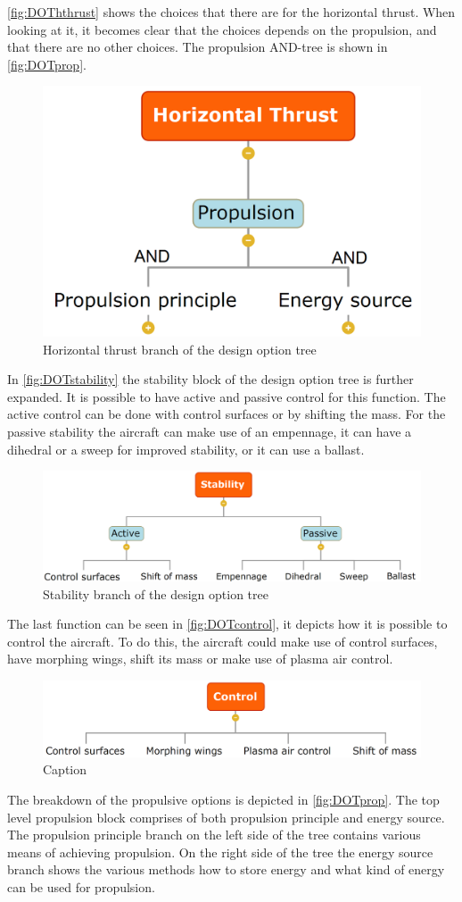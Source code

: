\autoref{fig:DOThthrust} shows the choices that there are for the horizontal thrust. When looking at it, it becomes clear that the choices depends on the propulsion, and that there are no other choices. The propulsion AND-tree is shown in \autoref{fig:DOTprop}.

\begin{figure}[H]
\centering
\includegraphics[width=.35\textwidth]{Concepts/Figures/Horizontal_Thrust}
\caption{Horizontal thrust branch of the design option tree}
\label{fig:DOThthrust}
\end{figure}

In \autoref{fig:DOTstability} the stability block of the design option tree is further expanded. It is possible to have active and passive control for this function. The active control can be done with control surfaces or by shifting the mass. For the passive stability the aircraft can make use of an empennage, it can have a dihedral or a sweep for improved stability, or it can use a ballast.

\begin{figure}[H]
\centering
\includegraphics[width=.25\textwidth]{Concepts/Figures/Stability}
\caption{Stability branch of the design option tree}
\label{fig:DOTstability}
\end{figure}

The last function can be seen in \autoref{fig:DOTcontrol}, it depicts how it is possible to control the aircraft. To do this, the aircraft could make use of control surfaces, have morphing wings, shift its mass or make use of plasma air control.

\begin{figure}
    \centering
    \includegraphics[width=.25\textwidth]{Concepts/Figures/Control}
    \caption{Caption}
    \label{fig:my_label}
\end{figure}

The breakdown of the propulsive options is depicted in \autoref{fig:DOTprop}. The top level propulsion block comprises of both propulsion principle and energy source. The propulsion principle branch on the left side of the tree contains various means of achieving propulsion. On the right side of the tree the energy source branch shows the various methods how to store energy and what kind of energy can be used for propulsion.

